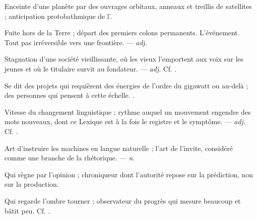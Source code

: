  Enceinte d'une planète par des ouvrages orbitaux, anneaux et treillis de satellites ; anticipation protobathmique de l'.

 Fuite hors de la Terre ; départ des premiers colons permanents.  L'événement.   Tout pas irréversible vers une frontière. ---  \textit{adj.}

 Stagnation d'une société vieillissante, où les vieux l'emportent aux voix sur les jeunes et où le titulaire survit au fondateur. ---  \textit{adj.} Cf. .

 Se dit des projets qui requièrent des énergies de l'ordre du gigawatt ou au-delà ; des personnes qui pensent à cette échelle. .

 Vitesse du changement linguistique ; rythme auquel un mouvement engendre des mots nouveaux, dont ce Lexique est à la fois le registre et le symptôme. ---  \textit{adj.} Cf. .

 Art d'instruire les machines en langue naturelle ; l'art de l'invite, considéré comme une branche de la rhétorique.  ---  \textit{n.}

  Qui règne par l'opinion ; chroniqueur dont l'autorité repose sur la prédiction, non sur la production.

 Qui regarde l'ombre tourner ; observateur du progrès qui mesure beaucoup et bâtit peu. Cf. .
